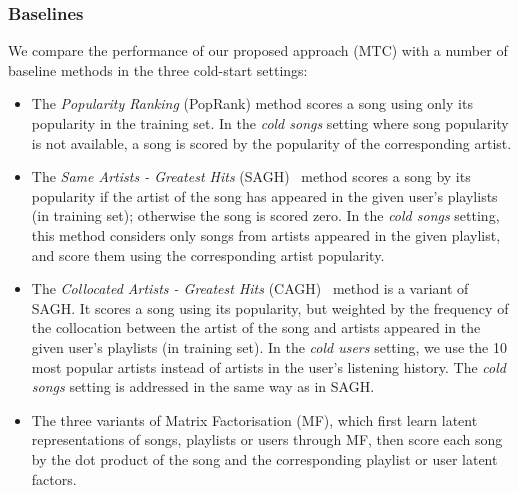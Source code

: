 \subsubsection{Baselines}
We compare the performance of our proposed approach (\ie MTC) %
with a number of baseline methods in the three cold-start settings:
\begin{itemize}
\item The {\it Popularity Ranking} (PopRank) method scores a song using only its popularity in the training set.
      In the \emph{cold songs} setting where song popularity is not available, 
      a song is scored by the popularity of the corresponding artist.
\item The {\it Same Artists - Greatest Hits} (SAGH)~\cite{mcfee2012million} method scores a song
      by its popularity if the artist of the song has appeared in the given user's playlists (in training set);
      otherwise the song is scored zero.
      In the {\it cold songs} setting, this method considers only songs from artists appeared in the given playlist,
      and score them using the corresponding artist popularity.
\item The {\it Collocated Artists - Greatest Hits} (CAGH)~\cite{bonnin2013evaluating} method is a variant of SAGH.
      It scores a song using its popularity, but weighted by the frequency of the collocation between the artist of the song
      and artists appeared in the given user's playlists (in training set).
      In the \emph{cold users} setting, we use the 10 most popular artists instead of artists in the user's listening history.
      The \emph{cold songs} setting is addressed in the same way as in SAGH.
\item The three variants of Matrix Factorisation (MF), which first learn latent representations of songs, playlists or users
      through MF, then score each song by the dot product of the song and the corresponding playlist or user latent factors.

\end{itemize}
